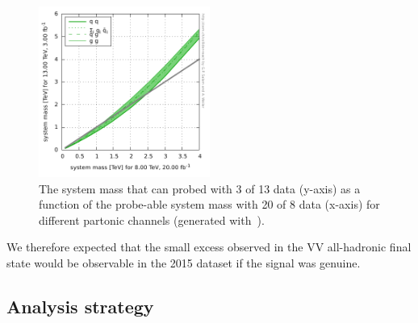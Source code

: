 \begin{figure}[h!] 
    \centering
    \includegraphics[width=0.50\textwidth]{figures/analysis/search1/misc/colliderReach.png}
    \caption{The system mass that can probed with 3 \fbinv of 13 \TeV data (y-axis) as a function of the probe-able system mass with 20 \fbinv of 8 \TeV data (x-axis) for different partonic channels (generated with~\cite{collreach}).}
    \label{fig:searchI:8vs13reach}
\end{figure}
We therefore expected that the small excess observed in the VV all-hadronic final state would be observable in the 2015 dataset if the signal was genuine.

\subsection{Analysis strategy}

